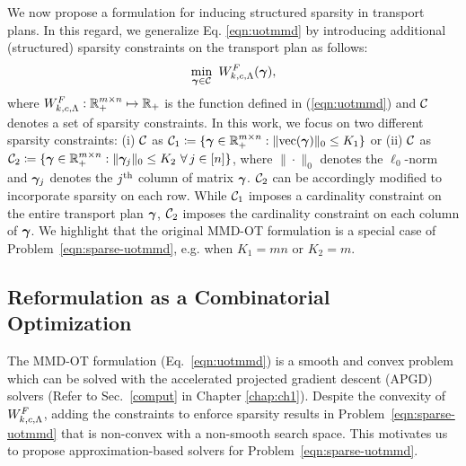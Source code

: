 We now propose a formulation for inducing structured sparsity in transport plans. In this regard, we generalize Eq. \ref{eqn:uotmmd} by introducing additional (structured) sparsity constraints on the transport plan as follows:
\begin{equation}\label{eqn:sparse-uotmmd}
\min\limits_{\bm{\gamma}\in \mathcal{C}}\ W^F_{k, c, \Lambda}({\bm{\gamma}}),
\end{equation}
where $W^F_{k, c, \Lambda}: \mathbb{R}^{m\times n}_{+}\mapsto \mathbb{R}_{+}$ is the function defined in (\ref{eqn:uotmmd}) and $\mathcal{C}$ denotes a set of sparsity constraints. In this work, we focus on two different sparsity constraints: (i) $\mathcal{C}$ as $\mathcal{C}_1\coloneqq \{\bm{\gamma}\in\mathbb{R}^{m\times n}_{+}:\|{\rm vec}(\bm{\gamma})\|_0\leq K_1\}$ or (ii) $\mathcal{C}$ as $\mathcal{C}_2\coloneqq \{\bm{\gamma}\in\mathbb{R}^{m\times n}_{+}:\|\bm{\gamma}_j\|_0\leq K_2\ \forall\, j\in[n]\}$, where $\|\cdot\|_0$ denotes the $\ell_0$-norm and $\bm{\gamma}_j$ denotes the $j^{\rm{th}}$ column of matrix $\bm{\gamma}$. $\mathcal{C}_2$ can be accordingly modified to incorporate sparsity on each row.
While $\mathcal{C}_1$ imposes a cardinality constraint on the entire transport plan $\bm{\gamma}$, $\mathcal{C}_2$ imposes the cardinality constraint on each column of $\bm{\gamma}$. We highlight that the original MMD-OT formulation is a special case of Problem~\ref{eqn:sparse-uotmmd}, e.g. when $K_1= mn$ or $K_2= m$. 
\subsection{Reformulation as a Combinatorial Optimization}\label{sec:sot-forml-subm}
The MMD-OT formulation (Eq.~\ref{eqn:uotmmd}) is a smooth and convex problem which can be solved with the accelerated projected gradient descent (APGD) solvers (Refer to Sec.~\ref{comput} in Chapter \ref{chap:ch1}). Despite the convexity of $W^F_{k, c, \Lambda}$, adding the constraints to enforce sparsity results in Problem~\ref{eqn:sparse-uotmmd} that is non-convex with a non-smooth search space. This motivates us to propose approximation-based solvers for Problem~\ref{eqn:sparse-uotmmd}.

